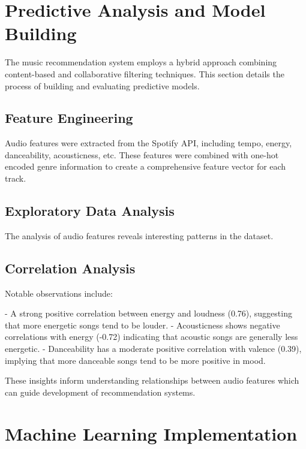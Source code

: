 \documentclass[runningheads]{llncs}
\begin{document}
\section{Predictive Analysis and Model Building}

The music recommendation system employs a hybrid approach combining content-based and collaborative filtering techniques. This section details the process of building and evaluating predictive models.

\subsection{Feature Engineering}

Audio features were extracted from the Spotify API, including tempo, energy, danceability, acousticness, etc. These features were combined with one-hot encoded genre information to create a comprehensive feature vector for each track.

\subsection{Exploratory Data Analysis}

The analysis of audio features reveals interesting patterns in the dataset.



\subsection{Correlation Analysis}

Notable observations include:

- A strong positive correlation between energy and loudness (0.76), suggesting that more energetic songs tend to be louder.
- Acousticness shows negative correlations with energy (-0.72) indicating that acoustic songs are generally less energetic.
- Danceability has a moderate positive correlation with valence (0.39), implying that more danceable songs tend to be more positive in mood.

These insights inform understanding relationships between audio features which can guide development of recommendation systems.

\section{Machine Learning Implementation}
\end{document}
